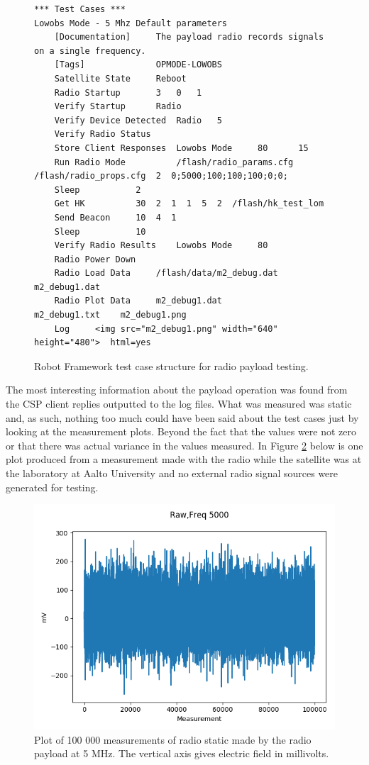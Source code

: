 \documentclass[english,12pt,a4paper,pdftex,elec,utf8]{aaltothesis}
\begin{document}
\begin{figure}[h!]
\centering
\begin{verbatim}
*** Test Cases ***
Lowobs Mode - 5 Mhz Default parameters
	[Documentation]		The payload radio records signals on a single frequency.
	[Tags]				OPMODE-LOWOBS
	Satellite State		Reboot
	Radio Startup		3	0	1
	Verify Startup		Radio
	Verify Device Detected	Radio 	5
	Verify Radio Status
	Store Client Responses	Lowobs Mode		80		15
	Run Radio Mode			/flash/radio_params.cfg  /flash/radio_props.cfg  2  0;5000;100;100;100;0;0;
	Sleep			2
	Get HK			30  2  1  1  5  2  /flash/hk_test_lom
	Send Beacon		10  4  1
	Sleep			10
	Verify Radio Results	Lowobs Mode		80
	Radio Power Down
	Radio Load Data 	/flash/data/m2_debug.dat 	m2_debug1.dat
	Radio Plot Data 	m2_debug1.dat 				m2_debug1.txt	 m2_debug1.png
	Log		<img src="m2_debug1.png" width="640" height="480">	html=yes
\end{verbatim}
\caption{Robot Framework test case structure for radio payload testing.}
\label{robotradio}
\end{figure}
The most interesting information about the payload operation was found from the CSP client replies outputted to the log files. What was measured was static and, as such, nothing too much could have been said about the test cases just by looking at the measurement plots. Beyond the fact that the values were not zero or that there was actual variance in the values measured. In Figure \ref{m1_debug1joo} below is one plot produced from a measurement made with the radio while the satellite was at the laboratory at Aalto University and no external radio signal sources were generated for testing.\par 
\begin{figure}[h!]
\centering
\includegraphics[scale=0.6]{m1_debug1}
\caption{Plot of 100 000 measurements of radio static made by the radio payload at 5 MHz. The vertical axis gives electric field in millivolts.}
\label{m1_debug1joo}
\end{figure}
\end{document}
